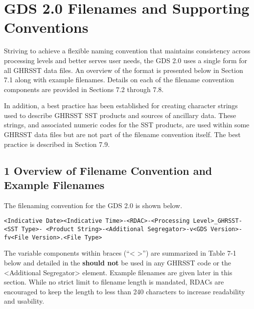 \pagebreak
\section{GDS 2.0 Filenames and Supporting Conventions}

Striving to achieve a flexible naming convention that maintains consistency across processing levels
and better serves user needs, the GDS 2.0 uses a single form for all GHRSST data files. An overview
of the format is presented below in Section 7.1 along with example filenames. Details on each of the
filename convention components are provided in Sections 7.2 through 7.8.
\par
In addition, a best practice has been established for creating character strings used to describe
GHRSST SST products and sources of ancillary data. These strings, and associated numeric codes
for the SST products, are used within some GHRSST data files but are not part of the filename
convention itself. The best practice is described in Section 7.9.
\par

\subsection{1 Overview of Filename Convention and Example Filenames}
The filenaming convention for the GDS 2.0 is shown below. 
\par \vspace{0.25in}

\small{\texttt{<Indicative Date><Indicative Time>-<RDAC>-<Processing Level>\_GHRSST-<SST Type>-
<Product String>-<Additional Segregator>-v<GDS Version>-fv<File Version>.<File Type>}}
\par \vspace{0.25in}

The variable components within braces (“< >”) are summarized in Table 7-1 below and detailed in the
\textbf{should not} be used in any GHRSST code or the <Additional Segregator> element. Example
filenames are given later in this section. While no strict limit to filename length is mandated, RDACs
are encouraged to keep the length to less than 240 characters to increase readability and usability.

